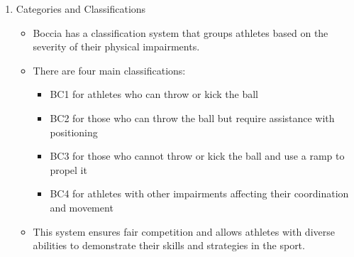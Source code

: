 \begin{enumerate}
\item Categories and Classifications
    \begin{itemize}
    \item Boccia has a classification system that groups athletes based on the severity of their physical impairments. 
    \item There are four main classifications:
        \begin{itemize}
        \item BC1 for athletes who can throw or kick the ball
        \item BC2 for those who can throw the ball but require assistance with positioning
        \item BC3 for those who cannot throw or kick the ball and use a ramp to propel it
        \item BC4 for athletes with other impairments affecting their coordination and movement
        \end{itemize} 
    \item This system ensures fair competition and allows athletes with diverse abilities to demonstrate their skills and strategies in the sport.
    \end{itemize}

\end{enumerate}
